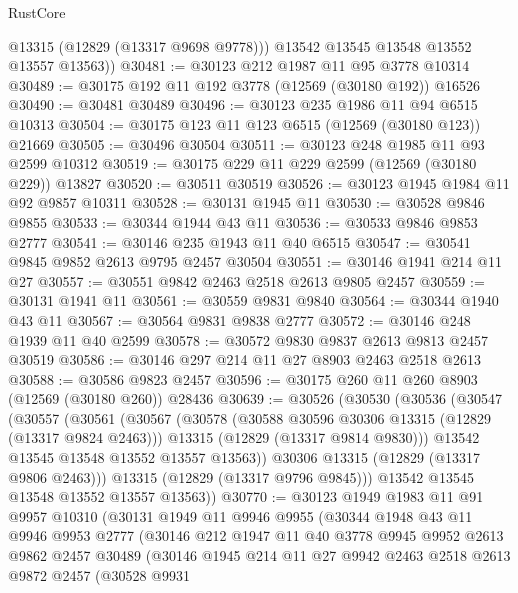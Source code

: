 \begin{lexlean}{RustCore}
\begin{coremodule}
          @13315
          (@12829 (@13317 @9698 @9778)))
        @13542
        @13545
        @13548
        @13552
        @13557
        @13563))
@30481 := @30123 @212 @1987 @11 @95 @3778 @10314
@30489 := @30175 @192 @11 @192 @3778 (@12569 (@30180 @192)) @16526
@30490 := @30481 @30489
@30496 := @30123 @235 @1986 @11 @94 @6515 @10313
@30504 := @30175 @123 @11 @123 @6515 (@12569 (@30180 @123)) @21669
@30505 := @30496 @30504
@30511 := @30123 @248 @1985 @11 @93 @2599 @10312
@30519 := @30175 @229 @11 @229 @2599 (@12569 (@30180 @229)) @13827
@30520 := @30511 @30519
@30526 := @30123 @1945 @1984 @11 @92 @9857 @10311
@30528 := @30131 @1945 @11
@30530 := @30528 @9846 @9855
@30533 := @30344 @1944 @43 @11
@30536 := @30533 @9846 @9853 @2777
@30541 := @30146 @235 @1943 @11 @40 @6515
@30547 := @30541 @9845 @9852 @2613 @9795 @2457 @30504
@30551 := @30146 @1941 @214 @11 @27
@30557 := @30551 @9842 @2463 @2518 @2613 @9805 @2457
@30559 := @30131 @1941 @11
@30561 := @30559 @9831 @9840
@30564 := @30344 @1940 @43 @11
@30567 := @30564 @9831 @9838 @2777
@30572 := @30146 @248 @1939 @11 @40 @2599
@30578 := @30572 @9830 @9837 @2613 @9813 @2457 @30519
@30586 := @30146 @297 @214 @11 @27 @8903 @2463 @2518 @2613
@30588 := @30586 @9823 @2457
@30596 := @30175 @260 @11 @260 @8903 (@12569 (@30180 @260)) @28436
@30639 := @30526
    (@30530
      (@30536
        (@30547
          (@30557
            (@30561
              (@30567
                (@30578
                  (@30588 @30596 @30306 @13315 (@12829 (@13317 @9824 @2463)))
                  @13315
                  (@12829 (@13317 @9814 @9830)))
                @13542
                @13545
                @13548
                @13552
                @13557
                @13563))
            @30306
            @13315
            (@12829 (@13317 @9806 @2463)))
          @13315
          (@12829 (@13317 @9796 @9845)))
        @13542
        @13545
        @13548
        @13552
        @13557
        @13563))
@30770 := @30123
    @1949
    @1983
    @11
    @91
    @9957
    @10310
    (@30131
      @1949
      @11
      @9946
      @9955
      (@30344
        @1948
        @43
        @11
        @9946
        @9953
        @2777
        (@30146
          @212
          @1947
          @11
          @40
          @3778
          @9945
          @9952
          @2613
          @9862
          @2457
          @30489
          (@30146
            @1945
            @214
            @11
            @27
            @9942
            @2463
            @2518
            @2613
            @9872
            @2457
            (@30528
              @9931

\end{coremodule}
\end{lexlean}
